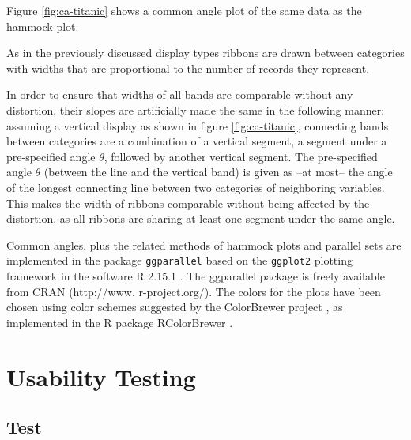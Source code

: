 \documentclass[journal]{vgtc}\usepackage{graphicx, color}
\begin{document}
Figure \ref{fig:ca-titanic} shows a common angle plot of the same data as the hammock plot.

As in the previously discussed display types ribbons are drawn between categories with widths  that are proportional to  the number of records they represent.

In order to ensure that  widths of all bands are  comparable without any distortion, their slopes  are artificially made the same in the following manner: 
assuming a vertical display as shown in figure \ref{fig:ca-titanic},  connecting bands between  categories  are a combination of a vertical  segment, a  segment under a pre-specified angle $\theta$, followed by another vertical  segment.  
The pre-specified angle $\theta$ (between the line and the vertical band) is given as --at most-- the angle of the longest connecting line between two categories of neighboring variables. 
This makes the width of ribbons  comparable without being affected by the distortion, as all ribbons are sharing at least one segment under the same angle. 


Common angles, plus the related methods of hammock plots and parallel sets are implemented in the  package \texttt{ggparallel} based on the \texttt{ggplot2} \citep{ggplot2} plotting framework in the software R 2.15.1 \citep{R}. The ggparallel package is freely available from CRAN (http://www. r-project.org/). The colors for the plots have been chosen using color schemes suggested by the ColorBrewer project \citep{colorbrewer}, as implemented in the R package RColorBrewer \citep{RColorBrewer}.

\section{Usability Testing}
\subsection{Test} \label{test}
\end{document}

